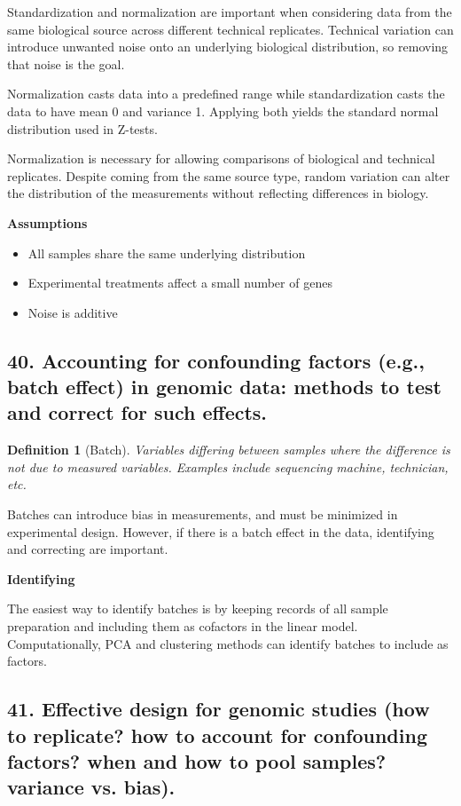 \documentclass{tufte-handout}
\theoremstyle{noparens}
\newtheorem*{define}{Definition}
\begin{document}
Standardization and normalization are important when considering data from the same biological source across different technical replicates. Technical variation can introduce unwanted noise onto an underlying biological distribution, so removing that noise is the goal.

Normalization casts data into a predefined range while standardization casts the data to have mean 0 and variance 1. Applying both yields the standard normal distribution used in Z-tests. 

Normalization is necessary for allowing comparisons of biological and technical replicates. Despite coming from the same source type, random variation can alter the distribution of the measurements without reflecting differences in biology.

\noindent
\textbf{Assumptions}

\begin{itemize}
	\item All samples share the same underlying distribution
	\item Experimental treatments affect a small number of genes
	\item Noise is additive
\end{itemize}

\newpage
\subsection{40. Accounting for confounding factors (e.g., batch effect) in genomic data: methods to test and correct for such effects.}
\begin{define}[Batch]
Variables differing between samples where the difference is not due to measured variables. Examples include sequencing machine, technician, etc.
\end{define}

Batches can introduce bias in measurements, and must be minimized in experimental design. However, if there is a batch effect in the data, identifying and correcting are important.

\noindent
\textbf{Identifying}

The easiest way to identify batches is by keeping records of all sample preparation and including them as cofactors in the linear model. Computationally, PCA and clustering methods can identify batches to include as factors. 

\newpage
\subsection{41. Effective design for genomic studies (how to replicate? how to account for confounding factors? when and how to pool samples? variance vs. bias).}
\end{document}
